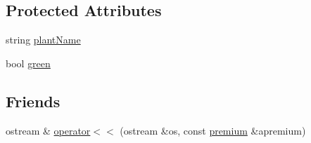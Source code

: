 \subsection*{Protected Attributes}
\begin{DoxyCompactItemize}
\item 
string \hyperlink{classpremium_a4f05a7a9d1c89cc711eaec81ba7c0065}{plantName}
\item 
bool \hyperlink{classpremium_a5a80b0f2ea4bb892c5022f40ec10f4cc}{green}
\end{DoxyCompactItemize}
\subsection*{Friends}
\begin{DoxyCompactItemize}
\item 
ostream \& \hyperlink{classpremium_ad40c91365d71deebcf91e1da3d66d78f}{operator$<$$<$} (ostream \&os, const \hyperlink{classpremium}{premium} \&apremium)
\end{DoxyCompactItemize}


